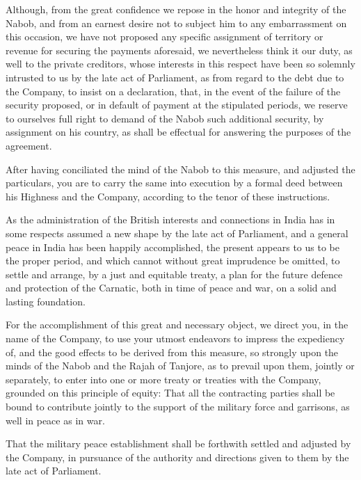 Although, from the great confidence we repose in the honor and integrity of the Nabob, and from an earnest desire not to subject him to any embarrassment on this occasion, we have not proposed any specific assignment of territory or revenue for securing the payments aforesaid, we nevertheless think it our duty, as well to the private creditors, whose interests in this respect have been so solemnly intrusted to us by the late act of Parliament, as from regard to the debt due to the Company, to insist on a declaration, that, in the event of the failure of the security proposed, or in default of payment at the stipulated periods, we reserve to ourselves full right to demand of the Nabob such additional security, by assignment on his country, as shall be effectual for answering the purposes of the agreement.

After having conciliated the mind of the Nabob to this measure, and adjusted the particulars, you are to carry the same into execution by a formal deed between his Highness and the Company, according to the tenor of these instructions.

As the administration of the British interests and connections in India has in some respects assumed a new shape by the late act of Parliament, and a general peace in India has been happily accomplished, the present appears to us to be the proper period, and which cannot without great imprudence be omitted, to settle and arrange, by a just and equitable treaty, a plan for the future defence and protection of the Carnatic, both in time of peace and war, on a solid and lasting foundation.

For the accomplishment of this great and necessary object, we direct you, in the name of the Company, to use your utmost endeavors to impress the expediency of, and the good effects to be derived from this measure, so strongly upon the minds of the Nabob and the Rajah of Tanjore, as to prevail upon them, jointly or separately, to enter into one or more treaty or treaties with the Company, grounded on this principle of equity: That all the contracting parties shall be bound to contribute jointly to the support of the military force and garrisons, as well in peace as in war.

That the military peace establishment shall be forthwith settled and adjusted by the Company, in pursuance of the authority and directions given to them by the late act of Parliament.

